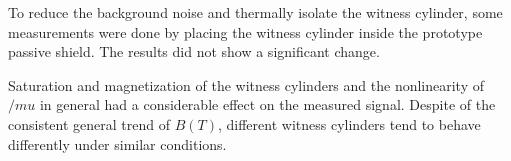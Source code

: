 To reduce the background noise and
thermally isolate the witness cylinder, some measurements were done by
placing the witness cylinder inside the prototype passive shield. The
results did not show a significant change.


Saturation and magnetization of the witness cylinders and the nonlinearity of $/mu$ in general had
a considerable effect on the measured signal. Despite of the consistent general trend of $B(T)$, different witness cylinders tend to behave differently under similar conditions. 












